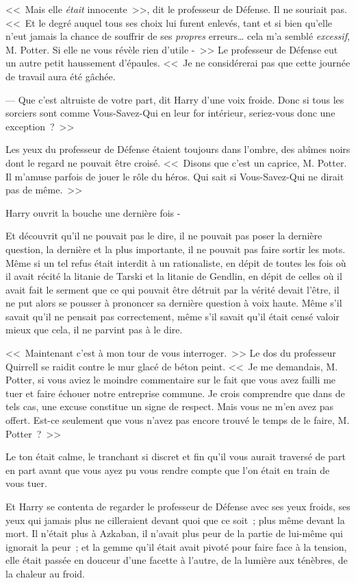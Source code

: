 <<~Mais elle \emph{était} innocente~>>, dit le professeur de Défense. Il ne souriait pas. <<~Et le degré auquel tous ses choix lui furent enlevés, tant et si bien qu'elle n'eut jamais la chance de souffrir de ses \emph{propres} erreurs… cela m'a semblé \emph{excessif}, M. Potter. Si elle ne vous révèle rien d'utile -~>> Le professeur de Défense eut un autre petit haussement d'épaules. <<~Je ne considérerai pas que cette journée de travail aura été gâchée.

--- Que c'est altruiste de votre part, dit Harry d'une voix froide. Donc si tous les sorciers sont comme Vous-Savez-Qui en leur for intérieur, seriez-vous donc une exception~?~>>

Les yeux du professeur de Défense étaient toujours dans l'ombre, des abîmes noirs dont le regard ne pouvait être croisé. <<~Disons que c'est un caprice, M. Potter. Il m'amuse parfois de jouer le rôle du héros. Qui sait si Vous-Savez-Qui ne dirait pas de même.~>>

Harry ouvrit la bouche une dernière fois -

Et découvrit qu'il ne pouvait pas le dire, il ne pouvait pas poser la dernière question, la dernière et la plus importante, il ne pouvait pas faire sortir les mots. Même si un tel refus était interdit à un rationaliste, en dépit de toutes les fois où il avait récité la litanie de Tarski et la litanie de Gendlin, en dépit de celles où il avait fait le serment que ce qui pouvait être détruit par la vérité devait l'être, il ne put alors se pousser à prononcer sa dernière question à voix haute. Même s'il savait qu'il ne pensait pas correctement, même s'il savait qu'il était censé valoir mieux que cela, il ne parvint pas à le dire.

<<~Maintenant c'est à mon tour de vous interroger.~>> Le dos du professeur Quirrell se raidit contre le mur glacé de béton peint. <<~Je me demandais, M. Potter, si vous aviez le moindre commentaire sur le fait que vous avez failli me tuer et faire échouer notre entreprise commune. Je crois comprendre que dans de tels cas, une excuse constitue un signe de respect. Mais vous ne m'en avez pas offert. Est-ce seulement que vous n'avez pas encore trouvé le temps de le faire, M. Potter~?~>>

Le ton était calme, le tranchant si discret et fin qu'il vous aurait traversé de part en part avant que vous ayez pu vous rendre compte que l'on était en train de vous tuer.

Et Harry se contenta de regarder le professeur de Défense avec ses yeux froids, ses yeux qui jamais plus ne cilleraient devant quoi que ce soit~; plus même devant la mort. Il n'était plus à Azkaban, il n'avait plus peur de la partie de lui-même qui ignorait la peur~; et la gemme qu'il était avait pivoté pour faire face à la tension, elle était passée en douceur d'une facette à l'autre, de la lumière aux ténèbres, de la chaleur au froid.

